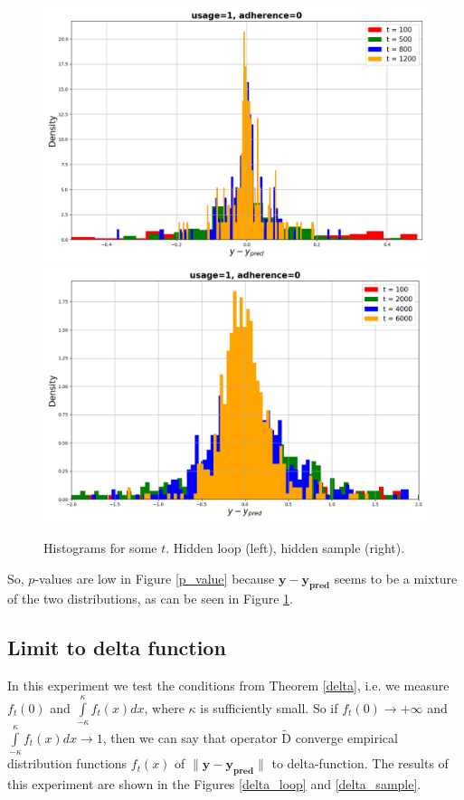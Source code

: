 \documentclass{article}
\begin{document}
        \begin{figure}[h!]
            \centering
            \includegraphics[width=0.49\linewidth]{pictures/hist_loop_1_0.png}
            \includegraphics[width=0.49\linewidth]{pictures/hist_sample_1_0.png}
            
            \caption{Histograms for some $t$. Hidden loop (left), hidden sample (right).}
            \label{hist}
        \end{figure}

        So, $p$-values are low in Figure \ref{p_value} because $\mathbf{y} - \mathbf{y_{\text{pred}}}$ seems to be a mixture of the two distributions, as can be seen in Figure \ref{hist}.

    \subsection{Limit to delta function} \label{exp_3}
        In this experiment we test the conditions from Theorem \ref{delta}, i.e. we measure $f_t(0)$ and $\int\limits_{-\kappa}^{\kappa}f_t(x)dx$, where $\kappa$ is sufficiently small. So if $f_t(0) \to +\infty$ and $\int\limits_{-\kappa}^{\kappa}f_t(x)dx \to 1$, then we can say that operator $\widetilde{\text{D}}$ converge empirical distribution functions $f_t(x)$ of $\|\mathbf{y} - \mathbf{y_{\text{pred}}}\|$ to delta-function. The results of this experiment are shown in the Figures \ref{delta_loop} and \ref{delta_sample}.
\end{document}
